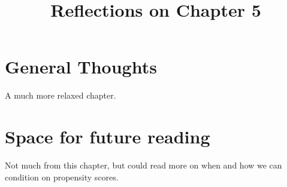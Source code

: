 \documentclass[10pt, english]{article}
\begin{document}
\title{Reflections on Chapter 5}
\date{}
\author{}

\maketitle


\section*{General Thoughts}
A much more relaxed chapter. 

\section*{Space for future reading}
Not much from this chapter, but could read more on when and how we can condition on propensity scores.
\end{document}
